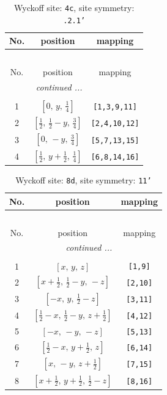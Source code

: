 \documentclass[fleqn,8pt]{jsarticle}
\begin{document}
\renewcommand{\arraystretch}{1.2}
\begin{longtable}{ccc}
\caption{Wyckoff site: {\tt 4c}, site symmetry: {\tt .2.1'}}
 \\
 \hline \hline
No. & position & mapping \\ \hline \endfirsthead

\multicolumn{2}{l}{\tablename\ \thetable{}} \\
 \hline \hline
No. & position & mapping \\ \hline \endhead

 \hline \hline
\multicolumn{2}{r}{\footnotesize\it continued ...} \\ \endfoot

 \hline \hline
\multicolumn{2}{r}{} \\ \endlastfoot

1 & $\left[ 0,\, y,\, \frac{1}{4} \right]$ & {\tt [1,3,9,11]} \\ \hline
2 & $\left[ \frac{1}{2},\, \frac{1}{2} - y,\, \frac{3}{4} \right]$ & {\tt [2,4,10,12]} \\ \hline
3 & $\left[ 0,\, - y,\, \frac{3}{4} \right]$ & {\tt [5,7,13,15]} \\ \hline
4 & $\left[ \frac{1}{2},\, y + \frac{1}{2},\, \frac{1}{4} \right]$ & {\tt [6,8,14,16]} \\
\end{longtable}
\renewcommand{\arraystretch}{1.2}
\begin{longtable}{ccc}
\caption{Wyckoff site: {\tt 8d}, site symmetry: {\tt 11'}}
 \\
 \hline \hline
No. & position & mapping \\ \hline \endfirsthead

\multicolumn{2}{l}{\tablename\ \thetable{}} \\
 \hline \hline
No. & position & mapping \\ \hline \endhead

 \hline \hline
\multicolumn{2}{r}{\footnotesize\it continued ...} \\ \endfoot

 \hline \hline
\multicolumn{2}{r}{} \\ \endlastfoot

1 & $\left[ x,\, y,\, z \right]$ & {\tt [1,9]} \\ \hline
2 & $\left[ x + \frac{1}{2},\, \frac{1}{2} - y,\, - z \right]$ & {\tt [2,10]} \\ \hline
3 & $\left[ - x,\, y,\, \frac{1}{2} - z \right]$ & {\tt [3,11]} \\ \hline
4 & $\left[ \frac{1}{2} - x,\, \frac{1}{2} - y,\, z + \frac{1}{2} \right]$ & {\tt [4,12]} \\ \hline
5 & $\left[ - x,\, - y,\, - z \right]$ & {\tt [5,13]} \\ \hline
6 & $\left[ \frac{1}{2} - x,\, y + \frac{1}{2},\, z \right]$ & {\tt [6,14]} \\ \hline
7 & $\left[ x,\, - y,\, z + \frac{1}{2} \right]$ & {\tt [7,15]} \\ \hline
8 & $\left[ x + \frac{1}{2},\, y + \frac{1}{2},\, \frac{1}{2} - z \right]$ & {\tt [8,16]} \\
\end{longtable}
\end{document}

